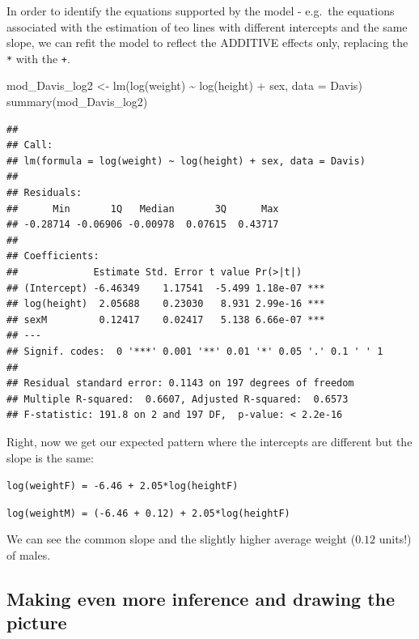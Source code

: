 \documentclass[
]{book}
\newenvironment{Shaded}{\begin{snugshade}}{\end{snugshade}}
\newcommand{\AttributeTok}[1]{\textcolor[rgb]{0.77,0.63,0.00}{#1}}
\newcommand{\FunctionTok}[1]{\textcolor[rgb]{0.00,0.00,0.00}{#1}}
\newcommand{\NormalTok}[1]{#1}
\newcommand{\OtherTok}[1]{\textcolor[rgb]{0.56,0.35,0.01}{#1}}
\newcommand{\SpecialCharTok}[1]{\textcolor[rgb]{0.00,0.00,0.00}{#1}}
\begin{document}
In order to identify the equations supported by the model - e.g.~the equations associated with the estimation of teo lines with different intercepts and the same slope, we can refit the model to reflect the ADDITIVE effects only, replacing the \texttt{*} with the \texttt{+}.

\begin{Shaded}
\begin{Highlighting}[]
\NormalTok{mod\_Davis\_log2 }\OtherTok{\textless{}{-}} \FunctionTok{lm}\NormalTok{(}\FunctionTok{log}\NormalTok{(weight) }\SpecialCharTok{\textasciitilde{}} \FunctionTok{log}\NormalTok{(height) }\SpecialCharTok{+}\NormalTok{ sex, }\AttributeTok{data =}\NormalTok{ Davis)}
\FunctionTok{summary}\NormalTok{(mod\_Davis\_log2)}
\end{Highlighting}
\end{Shaded}

\begin{verbatim}
## 
## Call:
## lm(formula = log(weight) ~ log(height) + sex, data = Davis)
## 
## Residuals:
##      Min       1Q   Median       3Q      Max 
## -0.28714 -0.06906 -0.00978  0.07615  0.43717 
## 
## Coefficients:
##             Estimate Std. Error t value Pr(>|t|)    
## (Intercept) -6.46349    1.17541  -5.499 1.18e-07 ***
## log(height)  2.05688    0.23030   8.931 2.99e-16 ***
## sexM         0.12417    0.02417   5.138 6.66e-07 ***
## ---
## Signif. codes:  0 '***' 0.001 '**' 0.01 '*' 0.05 '.' 0.1 ' ' 1
## 
## Residual standard error: 0.1143 on 197 degrees of freedom
## Multiple R-squared:  0.6607, Adjusted R-squared:  0.6573 
## F-statistic: 191.8 on 2 and 197 DF,  p-value: < 2.2e-16
\end{verbatim}

Right, now we get our expected pattern where the intercepts are different but the slope is the same:

\texttt{log(weightF)\ =\ -6.46\ +\ 2.05*log(heightF)}

\texttt{log(weightM)\ =\ (-6.46\ +\ 0.12)\ +\ 2.05*log(heightF)}

We can see the common slope and the slightly higher average weight (\(0.12\) units!) of males.

\hypertarget{making-even-more-inference-and-drawing-the-picture}{%
\subsection{Making even more inference and drawing the picture}\label{making-even-more-inference-and-drawing-the-picture}}
\end{document}
